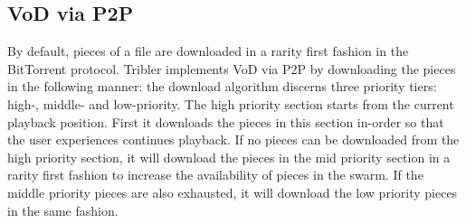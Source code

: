 \subsection{VoD via P2P} 
By default, pieces of a file are downloaded in a rarity first fashion in the BitTorrent protocol. Tribler implements VoD via P2P by downloading the pieces in the following manner\cite{libswift12}: the download algorithm discerns three priority tiers: high-, middle- and low-priority. The high priority section starts from the current playback position. First it downloads the pieces in this section in-order so that the user experiences continues playback. If no pieces can be downloaded from the high priority section, it will download the pieces in the mid priority section in a rarity first fashion to increase the availability of pieces in the swarm. If the middle priority pieces are also exhausted, it will download the low priority pieces in the same fashion. 

